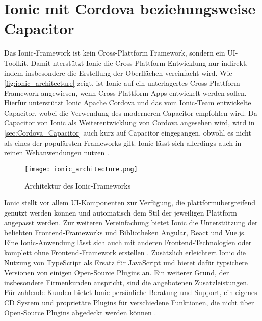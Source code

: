 

\section{Ionic mit Cordova beziehungsweise Capacitor}
\label{sec:Frameworks_Ionic}

Das Ionic-Framework ist kein Cross-Plattform Framework, sondern ein UI-Toolkit.
Damit nterstützt Ionic die Cross-Plattform Entwicklung nur indirekt, indem insbesondere die Erstellung der Oberflächen vereinfacht wird.
Wie \autoref{fig:ionic_architecture} zeigt, ist Ionic auf ein unterlagertes Cross-Plattform Framework angewiesen, wenn Cross-Plattform Apps entwickelt werden sollen.
Hierfür unterstützt Ionic Apache Cordova und das vom Ionic-Team entwickelte Capacitor, wobei die Verwendung des moderneren Capacitor empfohlen wird.
Da Capacitor von Ionic als Weiterentwicklung von Cordova angesehen wird, wird in \autoref{sec:Cordova_Capacitor} auch kurz auf Capacitor eingegangen, obwohl es nicht als eines der populärsten Frameworks gilt.
Ionic lässt sich allerdings auch in reinen Webanwendungen nutzen \cite{Ionic_Docs}.
\begin{figure}[h]
    \centering
    \texttt{[image: ionic\_architecture.png]}
    \caption{Architektur des Ionic-Frameworks \cite{Ionic_Architektur}}
    \label{fig:ionic_architecture}
\end{figure}
Ionic stellt vor allem UI-Komponenten zur Verfügung, die plattformübergreifend genutzt werden können und automatisch dem Stil der jeweiligen Plattform angepasst werden.
Zur weiteren Vereinfachung bietet Ionic die Unterstützung der beliebten Frontend-Frameworks und Bibliotheken Angular, React und Vue.js.
Eine Ionic-Anwendung lässt sich auch mit anderen Frontend-Technologien oder komplett ohne Frontend-Framework erstellen \cite{Ionic_Docs, Ionic_EvaluationGuide}.
Zusätzlich erleichtert Ionic die Nutzung von TypeScript als Ersatz für JavaScript und bietet dafür typsichere Versionen von einigen Open-Source Plugins an. %
Ein weiterer Grund, der insbesondere Firmenkunden anspricht, sind die angebotenen Zusatzleistungen.
Für zahlende Kunden bietet Ionic persönliche Beratung und Support, ein eigenes \ac{CD} System und proprietäre Plugins für verschiedene Funktionen, die nicht über Open-Source Plugins abgedeckt werden können \cite{Ionic_EvaluationGuide}.


